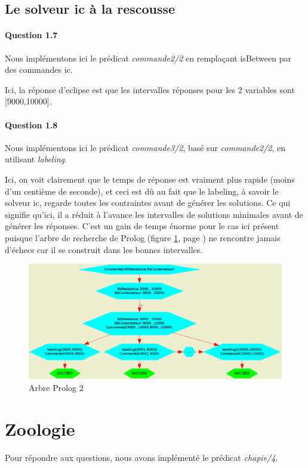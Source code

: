 \documentclass[11pt]{article} %
\begin{document}
\subsection{Le solveur ic à la rescousse}
\paragraph{Question 1.7}
Nous implémentons ici le prédicat \textit{commande2/2} en remplaçant isBetween par des commandes ic.

Ici, la réponse d'eclipse est que les intervalles réponses pour les 2 variables sont
[9000,10000].
\paragraph{Question 1.8}
Nous implémentons ici le prédicat \textit{commande3/2}, basé sur \textit{commande2/2}, en utilisant \textit{labeling}.

Ici, on voit clairement que le temps de réponse est vraiment plus rapide (moins d'un centième de seconde),
et ceci est dû au fait que le labeling, à savoir le solveur ic, regarde toutes les contraintes avant de
générer les solutions. Ce qui signifie qu'ici, il a réduit à l'avance les intervalles de solutions minimales
avant de générer les réponses. C'est un gain de temps énorme pour le cas ici présent puisque l'arbre de recherche
de Prolog (figure \ref{arbre2}, page \pageref{arbre2}) ne rencontre jamais d'échecs car il se construit dans les bonnes intervalles.
\begin{figure}
\includegraphics[width=15cm]{tp1-1.png}

\caption{\label{arbre2}Arbre Prolog 2}
\end{figure}

\newpage
\section{Zoologie}
Pour répondre aux questions, nous avons implémenté le prédicat \textit{chapie/4}.

\end{document}
